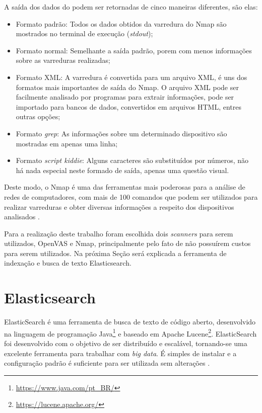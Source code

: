 A saída dos dados do  podem ser retornadas de cinco maneiras diferentes,  são elas:
\begin{itemize}
    \item Formato padrão: Todos os dados obtidos da varredura do \gls{Nmap} são mostrados no terminal de execução (\textit{stdout});
    \item Formato normal: Semelhante a saída padrão, porem com menos informações sobre as varreduras realizadas;
    \item Formato \gls{XML}: A varredura é convertida para um arquivo \gls{XML}, é uns dos formatos mais importantes de saída do \gls{Nmap}. O arquivo \gls{XML} pode ser facilmente analisado por programas para extrair informações, pode ser importado para bancos de dados, convertidos em arquivos \gls{HTML}, entres outras opções;
    \item Formato \textit{grep}: As informações sobre um determinado dispositivo são mostradas em apenas uma linha;
    \item Formato \textit{script kiddie}: Alguns caracteres são substituídos por números, não há nada especial neste formado de saída, apenas uma questão visual.
\end{itemize}

Deste modo, o \gls{Nmap} é uma das ferramentas mais poderosas para a análise de redes de computadores, com mais de 100 comandos que podem ser utilizados para realizar varreduras e obter diversas informações a respeito dos dispositivos analisados \cite{lyon2009nmap}.

Para a realização deste trabalho foram escolhida dois \textit{scanners} para serem utilizados, \gls{OpenVAS} e \gls{Nmap}, principalmente pelo fato de não possuírem custos para serem utilizados. Na próxima Seção será explicada a ferramenta de indexação e busca de texto Elasticsearch. 




\section{Elasticsearch}
ElasticSearch é uma ferramenta de busca  de texto de código aberto, desenvolvido na linguagem de programação Java\footnote{\url{https://www.java.com/pt_BR/}} e baseado em Apache Lucene\footnote{\url{https://lucene.apache.org/}}.  ElasticSearch foi desenvolvido com o objetivo de ser distribuído e escalável, tornando-se uma excelente ferramenta para trabalhar com \textit{big data}. É simples de instalar e a configuração padrão é suficiente para ser utilizada sem alterações \cite{Kononenko:2014:MMR:2597073.2597091}.

